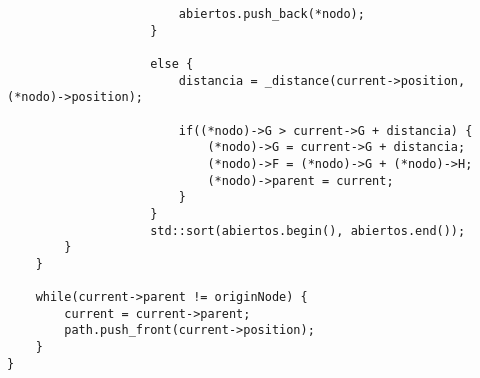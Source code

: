 \begin{lstlisting}
                        abiertos.push_back(*nodo);
                    }
                    
                    else {
                        distancia = _distance(current->position,(*nodo)->position);

                        if((*nodo)->G > current->G + distancia) {
                            (*nodo)->G = current->G + distancia;
                            (*nodo)->F = (*nodo)->G + (*nodo)->H;
                            (*nodo)->parent = current;
                        }
                    }
                    std::sort(abiertos.begin(), abiertos.end());
        }     
    }

    while(current->parent != originNode) {
        current = current->parent;
        path.push_front(current->position);
    }
}

\end{lstlisting}
